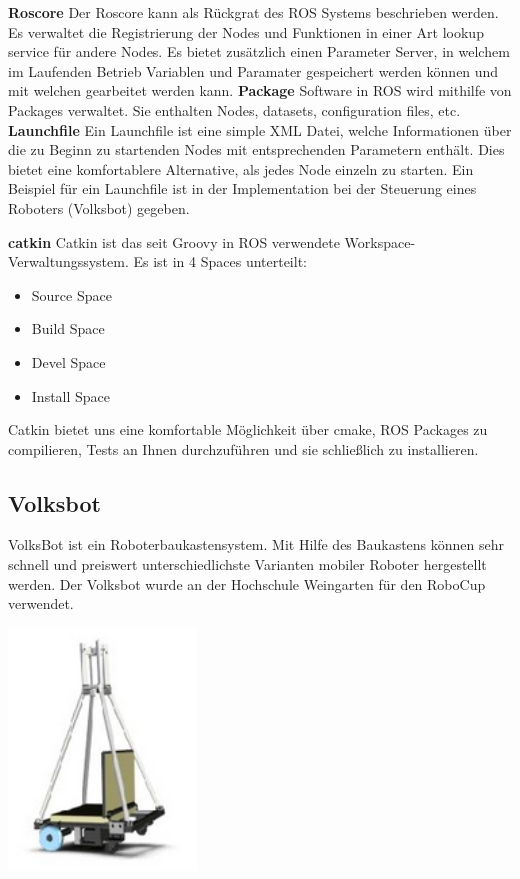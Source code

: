 \documentclass[12pt]{article}
\begin{document}
{\bf Roscore} Der Roscore kann als Rückgrat des ROS Systems beschrieben werden. Es verwaltet die Registrierung der Nodes und Funktionen in einer Art lookup service für andere Nodes. Es bietet zusätzlich einen Parameter Server, in welchem im Laufenden Betrieb Variablen und Paramater gespeichert werden können und mit welchen gearbeitet werden kann.
{\bf Package} Software in ROS wird mithilfe von Packages verwaltet.
Sie enthalten Nodes, datasets, configuration files, etc.
{\bf Launchfile} Ein Launchfile ist eine simple XML Datei, welche Informationen über die zu Beginn zu startenden Nodes mit entsprechenden Parametern enthält.
Dies bietet eine komfortablere Alternative, als jedes Node einzeln zu starten.
Ein Beispiel für ein Launchfile ist in der Implementation bei der Steuerung eines Roboters (Volksbot) gegeben.
 
{\bf catkin} Catkin ist das seit Groovy in ROS verwendete Workspace-Verwaltungssystem.
Es ist in 4 Spaces unterteilt:
\begin{itemize}
\item Source Space
\item Build Space
\item Devel Space
\item Install Space
\end{itemize}
Catkin bietet uns eine komfortable Möglichkeit über cmake, ROS Packages zu compilieren, Tests an Ihnen durchzuführen und sie schließlich zu installieren.

\subsection{Volksbot}
\parbox{8cm}{
VolksBot ist ein Roboterbaukastensystem.
Mit Hilfe des Baukastens können sehr schnell und preiswert unterschiedlichste Varianten mobiler Roboter hergestellt werden.
Der Volksbot wurde an der Hochschule Weingarten für den RoboCup verwendet.
}\hfill
\parbox{5cm}{
\includegraphics[width=5cm]{Volksbot.jpg}
}
\end{document}
